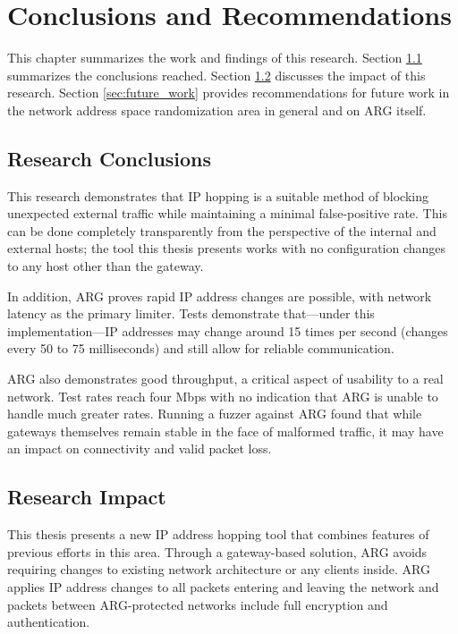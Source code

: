 \chapter{Conclusions and Recommendations}
\label{chp:conclusion}
\par This chapter summarizes the work and findings of this research. Section \ref{sec:research_conclusions} summarizes the conclusions reached. Section \ref{sec:research_impact} discusses the impact of this research. Section \ref{sec:future_work} provides recommendations for future work in the network address space randomization area in general and on \ac{ARG} itself.

\section{Research Conclusions}
\label{sec:research_conclusions}
\par This research demonstrates that \ac{IP} hopping is a suitable method of blocking unexpected external traffic while maintaining a minimal false-positive rate. This can be done completely transparently from the perspective of the internal and external hosts; the tool this thesis presents works with no configuration changes to any host other than the gateway.

\par In addition, \ac{ARG} proves rapid \ac{IP} address changes are possible, with network latency as the primary limiter. Tests demonstrate that---under this implementation---\ac{IP} addresses may change around 15 times per second (changes every 50 to 75 milliseconds) and still allow for reliable communication. 

\ac{ARG} also demonstrates good throughput, a critical aspect of usability to a real network. Test rates reach four \ac{Mbps} with no indication that \ac{ARG} is unable to handle much greater rates. Running a fuzzer against \ac{ARG} found that while gateways themselves remain stable in the face of malformed traffic, it may have an impact on connectivity and valid packet loss.

\section{Research Impact}
\label{sec:research_impact}
\par This thesis presents a new \ac{IP} address hopping tool that combines features of previous efforts in this area. Through a gateway-based solution, \ac{ARG} avoids requiring changes to existing network architecture or any clients inside. \ac{ARG} applies \ac{IP} address changes to all packets entering and leaving the network and packets between \ac{ARG}-protected networks include full encryption and authentication.

